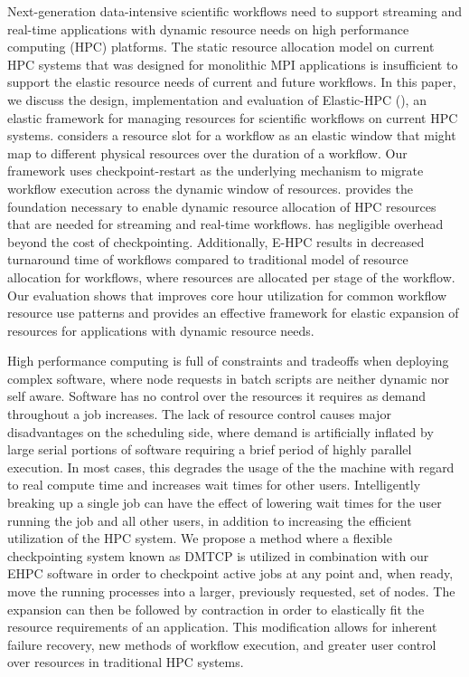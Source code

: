 Next-generation data-intensive scientific workflows need to support
streaming and real-time applications with dynamic resource needs on
high performance computing (HPC) platforms. The static resource
allocation model on current HPC systems that was designed for
monolithic MPI applications is insufficient to support the elastic
resource needs of current and future workflows. In this paper, we
discuss the design, implementation and evaluation of Elastic-HPC (\systemname),
an elastic framework for managing resources for scientific workflows
on current HPC systems. \systemname considers a resource slot for a workflow
as an elastic window that might map to different physical resources
over the duration of a workflow. Our framework uses checkpoint-restart
as the underlying mechanism to migrate workflow execution across the
dynamic window of resources. \systemname provides the foundation necessary
to enable dynamic resource allocation of HPC resources that are needed
for streaming and real-time workflows.
\systemname has negligible overhead
beyond the cost of checkpointing. Additionally, E-HPC results in
decreased turnaround time of workflows compared to traditional model
of resource allocation for workflows, where resources are allocated
per stage of the workflow. 
Our evaluation shows that \systemname improves
core hour utilization for common workflow resource use patterns and
provides an effective framework %
for elastic expansion of resources for applications with dynamic
resource needs.





High performance computing is full of constraints and tradeoffs when
deploying complex software, where node requests in batch scripts are
neither dynamic nor self aware.  Software has no control over the
resources it requires as demand throughout a job increases. The lack
of resource control causes major disadvantages on the scheduling side,
where demand is artificially inflated by large serial portions of
software requiring a brief period of highly parallel execution. In
most cases, this degrades the usage of the the machine with regard to
real compute time and increases wait times for other
users. Intelligently breaking up a single job can have the effect of
lowering wait times for the user running the job and all other users,
in addition to increasing the efficient utilization of the HPC
system. We propose a method where a flexible checkpointing system
known as DMTCP is utilized in combination with our EHPC software in
order to checkpoint active jobs at any point and, when ready, move the
running processes into a larger, previously requested, set of
nodes. The expansion can then be followed by contraction in order to
elastically fit the resource requirements of an application. This
modification allows for inherent failure recovery, new methods of
workflow execution, and greater user control over resources in
traditional HPC systems.
\fi
